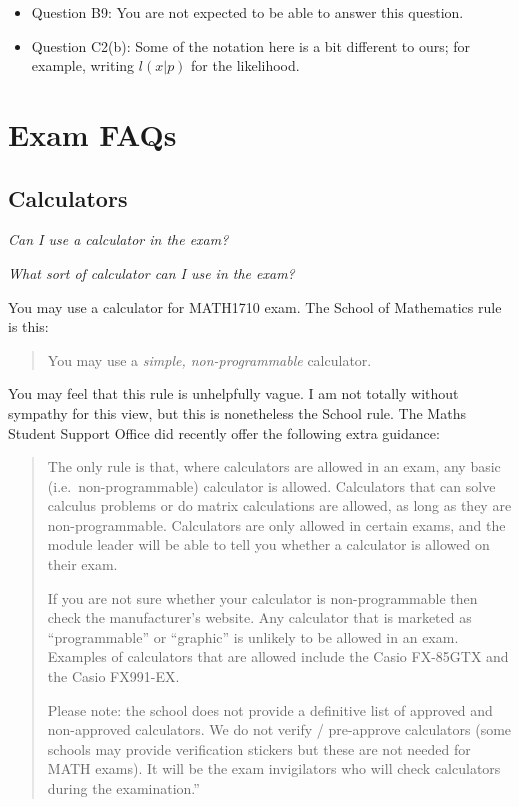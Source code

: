 \documentclass[
  letterpaper,
  DIV=11,
  numbers=noendperiod]{scrreprt}
\providecommand{\tightlist}{%
  \setlength{\itemsep}{0pt}\setlength{\parskip}{0pt}}\usepackage{longtable,booktabs,array}
\theoremstyle{remark}
\begin{document}
\begin{itemize}
  \begin{itemize}
  \tightlist
  \item
    Question B9: You are not expected to be able to answer this
    question.
  \item
    Question C2(b): Some of the notation here is a bit different to
    ours; for example, writing \(l(x|p)\) for the likelihood.
  \end{itemize}
\end{itemize}

\hypertarget{exam-faqs}{%
\section{Exam FAQs}\label{exam-faqs}}

\hypertarget{calculators}{%
\subsection{Calculators}\label{calculators}}

\emph{Can I use a calculator in the exam?}

\emph{What sort of calculator can I use in the exam?}

You may use a calculator for MATH1710 exam. The School of Mathematics
rule is this:

\begin{quote}
You may use a \emph{simple, non-programmable} calculator.
\end{quote}

You may feel that this rule is unhelpfully vague. I am not totally
without sympathy for this view, but this is nonetheless the School rule.
The Maths Student Support Office did recently offer the following extra
guidance:

\begin{quote}
The only rule is that, where calculators are allowed in an exam, any
basic (i.e.~non-programmable) calculator is allowed. Calculators that
can solve calculus problems or do matrix calculations are allowed, as
long as they are non-programmable. Calculators are only allowed in
certain exams, and the module leader will be able to tell you whether a
calculator is allowed on their exam.

If you are not sure whether your calculator is non-programmable then
check the manufacturer's website. Any calculator that is marketed as
``programmable'' or ``graphic'' is unlikely to be allowed in an exam.
Examples of calculators that are allowed include the Casio FX-85GTX and
the Casio FX991-EX.

Please note: the school does not provide a definitive list of approved
and non-approved calculators. We do not verify / pre-approve calculators
(some schools may provide verification stickers but these are not needed
for MATH exams). It will be the exam invigilators who will check
calculators during the examination.''
\end{quote}
\end{document}
